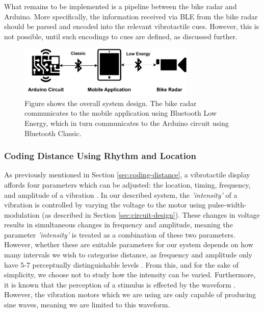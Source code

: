 \documentclass{mpaper}
\begin{document}
What remains to be implemented is a pipeline between the bike radar and Arduino. More specifically, the information received via BLE from the bike radar should be parsed and encoded into the relevant vibrotactile cues. However, this is not possible, until such encodings to cues are defined, as discussed further.

\begin{figure}[ht]
    \centering
    \includegraphics[width=0.75\textwidth]{images/overall-system.pdf}
    \caption{Figure shows the overall system design. The bike radar communicates to the mobile application using Bluetooth Low Energy, which in turn communicates to the Arduino circuit using Bluetooth Classic.}
    \label{fig:overall-system}
\end{figure}


\subsubsection{Coding Distance Using Rhythm and Location}
As previously mentioned in Section \ref{sec:coding-distance}, a vibrotactile display affords four parameters which can be adjusted: the location, timing, frequency, and amplitude of a vibration \cite{guidelines}. In our described system, the \textit{'intensity'} of a vibration is controlled by varying the voltage to the motor using pulse-width-modulation (as described in Section \ref{sec:circuit-design}). These changes in voltage results in simultaneous changes in frequency and amplitude, meaning the parameter \textit{'intensity'} is treated as a combination of these two parameters. However, whether these are suitable parameters for our system depends on how many intervals we wish to categorise distance, as frequency and amplitude only have 5-7 perceptually distinguishable levels \cite{guidelines}. From this, and for the sake of simplicity, we choose not to study how the intensity can be varied. Furthermore, it is known that the perception of a stimulus is effected by the waveform \cite{guidelines}. However, the vibration motors which we are using are only capable of producing sine waves, meaning we are limited to this waveform.
\end{document}
